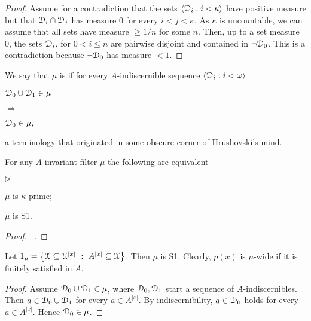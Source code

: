 \documentclass{amsproc}
\newcommand{\mylabel}[1]{{#1}\hfill}
\renewenvironment{itemize}
  {\begin{list}{$\triangleright$}{%
  \setlength{\parskip}{0mm}
  \setlength{\topsep}{.4\baselineskip}
  \setlength{\rightmargin}{0mm}
  \setlength{\listparindent}{0mm}
  \setlength{\itemindent}{0mm}
  \setlength{\labelwidth}{3ex}
  \setlength{\itemsep}{.2\baselineskip}
  \setlength{\parsep}{.2\baselineskip}
  \setlength{\partopsep}{0mm}
  \setlength{\labelsep}{1ex}
  \setlength{\leftmargin}{\labelwidth+\labelsep}
  \let\makelabel\mylabel}}{%
\end{list}}
\renewcommand*{\emph}[1]{%
   \smash{\tikz[baseline]\node[rectangle, fill=teal!25, rounded corners, inner xsep=0.5ex, inner ysep=0.2ex, anchor=base, minimum height = 2.7ex]{\strut #1};}}
\begin{document}
\begin{proof}
  Assume for a contradiction that the sets $\langle\EuScript D_i:i<\kappa\rangle$ have positive measure but that $\EuScript D_i\cap \EuScript D_j$ has measure $0$ for every $i<j<\kappa$.
  As $\kappa$ is uncountable, we can assume that all sets have measure $\ge 1/n$ for some $n$.
  Then, up to a set measure $0$, the sets $\EuScript D_i$, for $0<i\le n$ are pairwise disjoint and contained in $\neg\EuScript D_0$.
  This is a contradiction because $\neg\EuScript D_0$ has measure $<1$.
\end{proof}

We say that $\mu$ is \emph{S1\/} if for every $A$-indiscernible sequence $\langle\EuScript D_i:i<\omega\rangle$
    
\def\ceq#1#2#3{\parbox[t]{25ex}{$\displaystyle #1$}\parbox{6ex}{\hfil $#2$}{$\displaystyle #3$}}

\ceq{\hfill\EuScript D_0\cup\EuScript D_1\in\mu}{\Rightarrow}{\EuScript D_0\in\mu,}

a terminology that originated in some obscure corner of Hrushovski's mind.

\begin{fact}
  For any $A$-invariant filter $\mu$ the following are equivalent
  \begin{itemize}
    \item[1.] $\mu$ is $\kappa$-prime;
    \item[2.] $\mu$ is S1.
  \end{itemize}
\end{fact}

\begin{proof}
  ...
\end{proof}

\begin{example}\label{ex_mu_fin_sat}
  Let $1_\mu=\big\{\EuScript X\subseteq\EuScript U^{|x|}\ :\ A^{|x|}\subseteq\EuScript X\big\}$.
  Then $\mu$ is S1.
  Clearly, $p(x)$ is $\mu$-wide if it is finitely satisfied in $A$.
\end{example}

\begin{proof} 
  Assume $\EuScript D_0\cup\EuScript D_1\in\mu$, where $\EuScript D_0,\EuScript D_1$ start a sequence of $A$-indiscernibles.
  Then $a\in\EuScript D_0\cup\EuScript D_1$ for every $a\in A^{|x|}$.
  By indiscernibility, $a\in\EuScript D_0$ holds for every $a\in A^{|x|}$.
  Hence $\EuScript D_0\in\mu$.
\end{proof}
\end{document}
